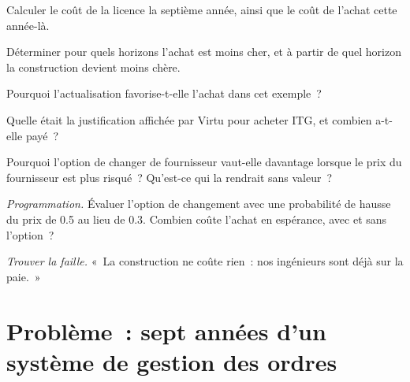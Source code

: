 \begin{exercise}[$\star$]\label{exo:fm:build-against-buy:2}
Calculer le coût de la licence la septième année, ainsi que le coût de l'achat cette année-là.
\end{exercise}

\begin{exercise}[$\star$]\label{exo:fm:build-against-buy:3}
Déterminer pour quels horizons l'achat est moins cher, et à partir de quel horizon la construction devient moins chère.
\end{exercise}

\begin{exercise}[$\star\star$]\label{exo:fm:build-against-buy:4}
Pourquoi l'actualisation favorise-t-elle l'achat dans cet exemple~?
\end{exercise}

\begin{exercise}[$\star\star$]\label{exo:fm:build-against-buy:5}
Quelle était la justification affichée par Virtu pour acheter ITG, et combien a-t-elle payé~?
\end{exercise}

\begin{exercise}[$\star\star$]\label{exo:fm:build-against-buy:6}
Pourquoi l'option de changer de fournisseur vaut-elle davantage lorsque le prix du fournisseur est plus risqué~? Qu'est-ce qui la rendrait sans valeur~?
\end{exercise}

\begin{exercise}[$\star\star\star$]\label{exo:fm:build-against-buy:7}
\emph{Programmation.} Évaluer l'option de changement avec une probabilité de hausse du prix de 0.5 au lieu de 0.3. Combien coûte l'achat en espérance, avec
et sans l'option~?
\end{exercise}

\begin{exercise}[$\star\star\star$]\label{exo:fm:build-against-buy:8}
\emph{Trouver la faille.} «~La construction ne coûte rien~: nos ingénieurs sont déjà sur la paie.~»
\end{exercise}

\section{Problème~: sept années d'un système de gestion des ordres}

